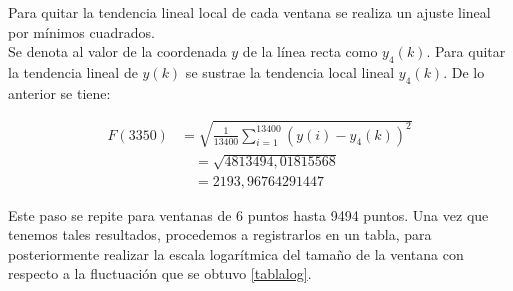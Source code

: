\documentclass[letterpaper,titlepage,12pt]{report}
\begin{document}
Para quitar la tendencia lineal local de cada ventana se realiza un ajuste lineal por m\'inimos cuadrados.\\ 

Se denota al valor de la coordenada $y$ de la l\'inea recta como $y_{4}(k)$. Para quitar la tendencia lineal de $y(k)$ se sustrae la tendencia local lineal $y_{4}(k)$. De lo anterior se tiene:

\begin{equation*}
\begin{split}
F(3350) & =\sqrt{\frac{1}{13400}\sum_{i=1}^{13400}(y(i)-y_4(k))^2}\\
& \quad =\sqrt{4813494,01815568}\\
& \quad =2193,96764291447
\end{split}
\end{equation*}



Este paso se repite para ventanas de 6 puntos hasta 9494 puntos. Una vez que tenemos tales resultados, procedemos a registrarlos en un tabla, para posteriormente realizar la escala logar\'itmica del tama\~no de la ventana con respecto a la fluctuaci\'on que se obtuvo \ref{tablalog}.
\end{document}
